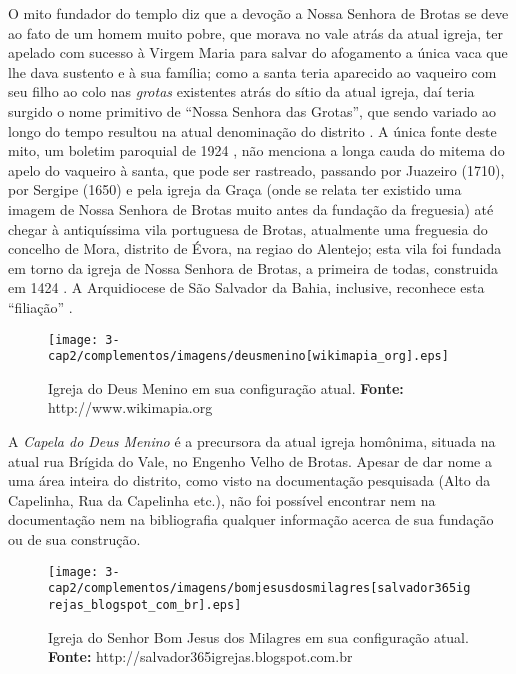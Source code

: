 O mito fundador do templo diz que a devoção a Nossa Senhora de Brotas se deve ao fato de um homem muito pobre, que morava no vale atrás da atual igreja, ter apelado com sucesso à Virgem Maria para salvar do afogamento a única vaca que lhe dava sustento e à sua família; como a santa teria aparecido ao vaqueiro com seu filho ao colo nas \textit{grotas} existentes atrás do sítio da atual igreja, daí teria surgido o nome primitivo de ``Nossa Senhora das Grotas'', que sendo variado ao longo do tempo resultou na atual denominação do distrito \cite{campos_brotas_1942,texbar_capellas_1930}. A única fonte deste mito, um boletim paroquial de 1924 \cite[p.~345]{texbar_capellas_1930}, não menciona a longa cauda do mitema do apelo do vaqueiro à santa, que pode ser rastreado, passando por Juazeiro (1710), por Sergipe (1650) e pela igreja da Graça (onde se relata ter existido uma imagem de Nossa Senhora de Brotas muito antes da fundação da freguesia) \cite[p.~89-92]{campos_brotas_1942} até chegar à antiquíssima vila portuguesa de Brotas, atualmente uma freguesia do concelho de Mora, distrito de Évora, na regiao do Alentejo; esta vila foi fundada em torno da igreja de Nossa Senhora de Brotas, a primeira de todas, construida em 1424 \cite{campos_brotas_1942, correia_brotas_2010}. A Arquidiocese de São Salvador da Bahia, inclusive, reconhece esta ``filiação'' \cite{arqui_brotas_2015}.

\begin{figure}[!htp]
\centering
\texttt{[image: 3-cap2/complementos/imagens/deusmenino[wikimapia\_org].eps]} 
\caption{Igreja do Deus Menino em sua configuração atual. \textbf{Fonte:} http://www.wikimapia.org}
\end{figure}

A \textit{Capela do Deus Menino} é a precursora da atual igreja homônima, situada na atual rua Brígida do Vale, no Engenho Velho de Brotas. Apesar de dar nome a uma área inteira do distrito, como visto na documentação pesquisada (Alto da Capelinha, Rua da Capelinha etc.), não foi possível encontrar nem na documentação nem na bibliografia qualquer informação acerca de sua fundação ou de sua construção.  

\begin{figure}[!htp]
\centering
\texttt{[image: 3-cap2/complementos/imagens/bomjesusdosmilagres[salvador365igrejas\_blogspot\_com\_br].eps]} 
\caption{Igreja do Senhor Bom Jesus dos Milagres em sua configuração atual. \textbf{Fonte:} http://salvador365igrejas.blogspot.com.br}
\end{figure}

